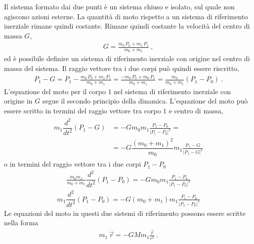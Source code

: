\documentclass[letterpaper,10pt,italian]{jupyterBook}
\begin{document}
\sphinxAtStartPar
Il sistema formato dai due punti è un sistema chiuso e isolato, sul quale non agiscono azioni esterne. La quantità di moto rispetto a un sistema di riferimento inerziale rimane quindi costante. Rimane quindi costante la velocità del centro di massa \(G\),
\begin{equation*}
\begin{split}G = \frac{m_0 \, P_0 + m_1 \, P_1}{m_0 + m_1} \ ,\end{split}
\end{equation*}
\sphinxAtStartPar
ed è possibile definire un sistema di riferimento inerziale con origine nel centro di massa del sistema. Il raggio vettore tra i due corpi può quindi essere riscritto,
\begin{equation*}
\begin{split}P_1 - G = P_1 - \frac{m_0 \, P_0 + m_1 \, P_1}{m_0 + m_1} = \frac{ - m_0 \, P_0 + m_0 \, P_1}{m_0 + m_1} = \frac{m_0}{m_0 + m_1}(P_1 - P_0) \ .\end{split}
\end{equation*}
\sphinxAtStartPar
L’equazione del moto per il corpo \(1\) nel sistema di riferimento inerziale con origine in \(G\) segue il secondo principio della dinamica. L’equazione del moto può essere scritto in termini del raggio vettore tra corpo \(1\) e centro di massa,
\begin{equation*}
\begin{split}\begin{aligned}
  m_1 \dfrac{d^2}{dt^2}(P_1-G) & = - G m_0 m_1 \frac{P_1 - P_0}{|P_1 - P_0|^3} = \\
                               & = - G \dfrac{(m_0 + m_1)^2}{m_0} m_1 \frac{P_1 - G}{|P_1 - G|^3} 
\end{aligned}\end{split}
\end{equation*}
\sphinxAtStartPar
o in termini del raggio vettore tra i due corpi \(P_1 - P_0\)
\begin{equation*}
\begin{split}
  \frac{m_0 m_1}{m_0 + m_1} \dfrac{d^2}{dt^2}(P_1-P_0) = - G m_0 m_1 \frac{P_1 - P_0}{|P_1 - P_0|^3} 
\end{split}
\end{equation*}\begin{equation*}
\begin{split}
  m_1 \dfrac{d^2}{dt^2}(P_1-P_0) = - G ( m_0 + m_1 ) m_1 \frac{P_1 - P_0}{|P_1 - P_0|^3} 
\end{split}
\end{equation*}
\sphinxAtStartPar
Le equazioni del moto in questi due sistemi di riferimento possono essere scritte nella forma
\begin{equation*}
\begin{split}m_1 \, \ddot{\vec{r}} = - G M m_1 \frac{\vec{r}}{r^3} \ .\end{split}
\end{equation*}
\end{document}
